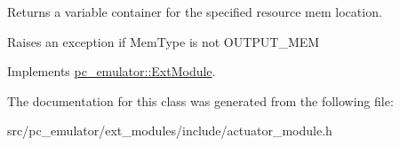 Returns a variable container for the specified resource mem location. 

Raises an exception if Mem\+Type is not O\+U\+T\+P\+U\+T\+\_\+\+M\+EM 

Implements \hyperlink{classpc__emulator_1_1ExtModule_ab62dc4b158134b37e1851a79e009b194}{pc\+\_\+emulator\+::\+Ext\+Module}.



The documentation for this class was generated from the following file\+:\begin{DoxyCompactItemize}
\item 
src/pc\+\_\+emulator/ext\+\_\+modules/include/actuator\+\_\+module.\+h\end{DoxyCompactItemize}
